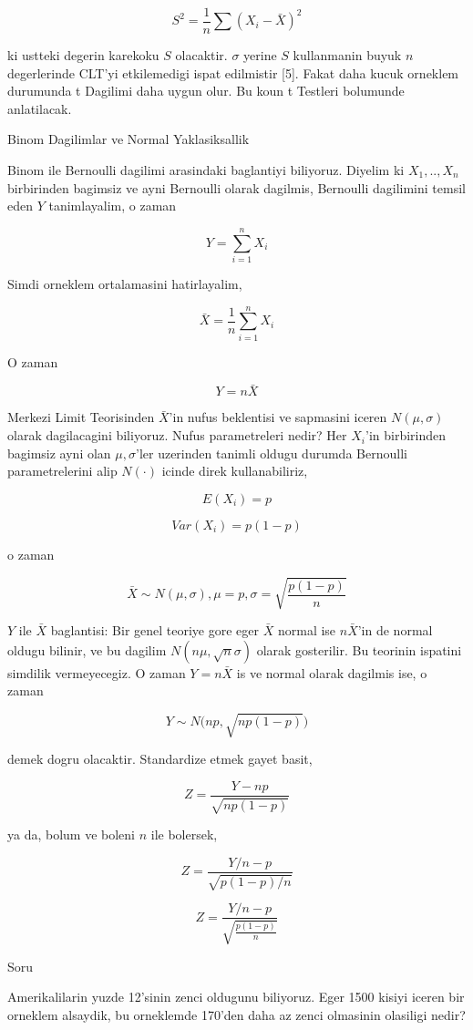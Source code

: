 \documentclass[12pt,fleqn]{article}\usepackage{../common}
\begin{document}
$$ S^2 = \frac{1}{n} \sum (X_i - \bar{X})^2
$$

ki ustteki degerin karekoku $S$ olacaktir. $\sigma$ yerine $S$ kullanmanin 
buyuk $n$ degerlerinde CLT'yi etkilemedigi ispat edilmistir [5]. Fakat daha
kucuk orneklem durumunda t Dagilimi daha uygun olur. Bu koun t Testleri
bolumunde anlatilacak.

Binom Dagilimlar ve Normal Yaklasiksallik

Binom ile Bernoulli dagilimi arasindaki baglantiyi biliyoruz. Diyelim ki
$X_1,..,X_n$ birbirinden bagimsiz ve ayni Bernoulli olarak dagilmis,
Bernoulli dagilimini temsil eden $Y$ tanimlayalim, o zaman

$$ Y = \sum_{i=1}^n X_i $$

Simdi orneklem ortalamasini hatirlayalim,

$$ \bar{X} = \frac{1}{n}  \sum_{i=1}^n X_i $$

O zaman 

$$ Y = n\bar{X}  $$

Merkezi Limit Teorisinden $\bar{X}$'in nufus beklentisi ve sapmasini iceren
$N(\mu,\sigma)$ olarak dagilacagini biliyoruz. Nufus parametreleri nedir?
Her $X_i$'in birbirinden bagimsiz ayni olan $\mu,\sigma$'ler uzerinden
tanimli oldugu durumda Bernoulli parametrelerini alip $N(\cdot)$ icinde
direk kullanabiliriz,

$$E(X_i) = p$$

$$ Var(X_i) = p(1-p) $$

o zaman 

$$\bar{X} \sim N(\mu,\sigma), \mu = p, \sigma = \sqrt{\frac{p(1-p)}{n}}$$

$Y$ ile $\bar{X}$ baglantisi: Bir genel teoriye gore eger $\bar{X}$ normal
ise $n\bar{X}$'in de normal oldugu bilinir, ve bu dagilim
$N(n\mu,\sqrt{n}\sigma)$ olarak gosterilir. Bu teorinin ispatini simdilik
vermeyecegiz. O zaman $Y = n\bar{X}$ is ve normal olarak dagilmis ise, o zaman 

$$ Y \sim N\bigg(np, \sqrt{np(1-p)}\bigg)$$

demek dogru olacaktir. Standardize etmek gayet basit,


$$Z  = \frac{Y - np}{\sqrt{np(1-p)}}$$

ya da, bolum ve boleni $n$ ile bolersek,

$$Z  = \frac{Y/n - p}{\sqrt{p(1-p)/n}}$$


$$Z  = \frac{Y/n - p}{\sqrt{\frac{p(1-p)}{n}}}$$

Soru

Amerikalilarin yuzde 12'sinin zenci oldugunu biliyoruz. Eger 1500 kisiyi
iceren bir orneklem alsaydik, bu orneklemde 170'den daha az zenci
olmasinin olasiligi nedir? 
\end{document}

